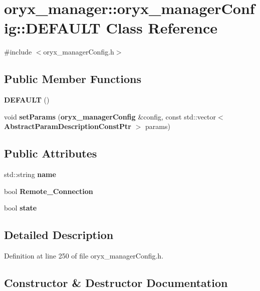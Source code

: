 \section{oryx\-\_\-manager\-:\-:oryx\-\_\-manager\-Config\-:\-:\-D\-E\-F\-A\-U\-L\-T \-Class \-Reference}
\label{classoryx__manager_1_1oryx__managerConfig_1_1DEFAULT}


{\ttfamily \#include $<$oryx\-\_\-manager\-Config.\-h$>$}

\subsection*{\-Public \-Member \-Functions}
\begin{DoxyCompactItemize}
\item 
{\bf \-D\-E\-F\-A\-U\-L\-T} ()
\item 
void {\bf set\-Params} ({\bf oryx\-\_\-manager\-Config} \&config, const std\-::vector$<$ {\bf \-Abstract\-Param\-Description\-Const\-Ptr} $>$ params)
\end{DoxyCompactItemize}
\subsection*{\-Public \-Attributes}
\begin{DoxyCompactItemize}
\item 
std\-::string {\bf name}
\item 
bool {\bf \-Remote\-\_\-\-Connection}
\item 
bool {\bf state}
\end{DoxyCompactItemize}


\subsection{\-Detailed \-Description}


\-Definition at line 250 of file oryx\-\_\-manager\-Config.\-h.



\subsection{\-Constructor \& \-Destructor \-Documentation}

